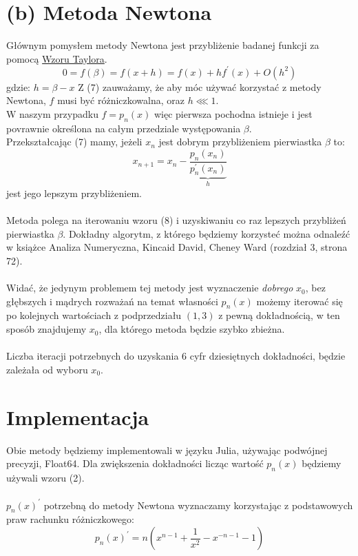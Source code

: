 \documentclass{article}
\begin{document}
\section{(b) Metoda Newtona}
Głównym pomysłem metody Newtona jest przybliżenie badanej funkcji za pomocą \href{https://pl.wikipedia.org/wiki/Wz%C3%B3r_Taylora}{Wzoru Taylora}.
\begin{equation}
0 = f(\beta) = f(x + h) = f(x) + hf^\prime(x) + O(h^2)
\end{equation}
gdzie: 
$h = \beta - x$
Z (7) zauważamy, że aby móc używać korzystać z metody Newtona, $f$ musi być różniczkowalna, oraz $h \lll 1$.\\ W naszym przypadku $f =p_n(x)$ więc pierwsza pochodna istnieje i jest povrawnie określona na całym przedziale występowania $\beta$.\\
Przekształcając (7) mamy, jeżeli $x_n$ jest dobrym przybliżeniem pierwiastka $\beta$ to:
\begin{equation}
x_{n+1} = x_n - \underbrace{\frac{p_n(x_n)}{p_n^\prime(x_n)}}_h
\end{equation}
jest jego lepszym przybliżeniem.\\\\Metoda polega na iterowaniu wzoru (8) i uzyskiwaniu co raz lepszych przybliżeń pierwiastka $\beta$. Dokładny algorytm, z którego będziemy korzysteć można odnaleźć w książce Analiza Numeryczna, Kincaid David, Cheney Ward (rozdział 3, strona 72).\\\\
Widać, że jedynym problemem tej metody jest wyznaczenie \textit{dobrego} $x_0$, bez głębszych i mądrych rozważań na temat własności $p_n(x)$ możemy iterować się po kolejnych wartościach z podprzedziału $(1,3)$ z pewną dokładnością, w ten sposób znajdujemy $x_0$, dla którego metoda będzie szybko zbieżna.\\\\
Liczba iteracji potrzebnych do uzyskania 6 cyfr dziesiętnych dokładności, będzie zależała od wyboru $x_0$.
\section{Implementacja}
Obie metody będziemy implementowali w języku Julia, używając podwójnej precyzji, Float64.
Dla zwiększenia dokładności licząc wartość $p_n(x)$ będziemy używali wzoru (2).\\\\
$p_n(x)^\prime$ potrzebną do metody Newtona wyznaczamy korzystając z podstawowych praw rachunku różniczkowego:
\begin{equation}
p_n(x)^\prime = n ( x^{n-1} + \frac{1}{x^2} - x^{-n - 1} -1)
\end{equation}
\end{document}
